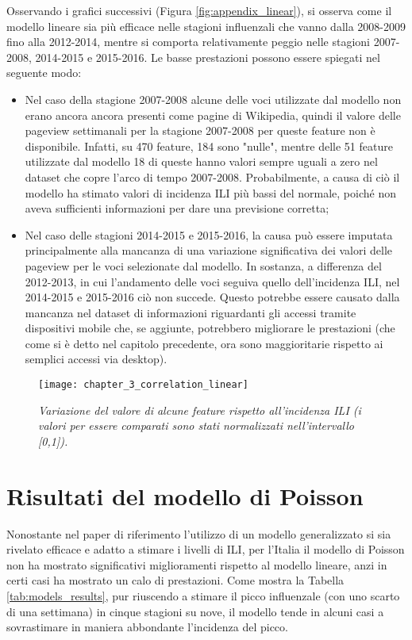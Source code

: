 Osservando i grafici successivi (Figura \ref{fig:appendix_linear}), si osserva come il modello lineare sia più efficace 
nelle stagioni influenzali che vanno dalla 2008-2009 fino alla 2012-2014, mentre si comporta relativamente peggio nelle 
stagioni 2007-2008, 2014-2015 e 2015-2016. Le basse prestazioni possono essere spiegati nel seguente modo: 
\begin{itemize}
\item Nel caso della stagione 2007-2008 alcune delle voci utilizzate dal modello non erano ancora ancora presenti come 
pagine di Wikipedia, quindi il valore delle pageview settimanali per la stagione 2007-2008 per queste feature non è 
disponibile. Infatti, su 470 feature, 184 sono "nulle", mentre delle 51 feature utilizzate dal modello 18 di queste hanno 
valori sempre uguali a zero nel dataset che copre l'arco di tempo 2007-2008. Probabilmente, a causa di ciò il modello ha 
stimato valori di incidenza ILI più bassi del normale, poiché non aveva sufficienti informazioni per dare una previsione 
corretta;
\item Nel caso delle stagioni 2014-2015 e 2015-2016, la causa può essere imputata principalmente alla mancanza di una 
variazione significativa dei valori delle pageview per le voci selezionate dal modello. In sostanza, a differenza del 
2012-2013, in cui l'andamento delle voci seguiva quello dell'incidenza ILI, nel 2014-2015 e 2015-2016 ciò non succede. 
Questo potrebbe essere causato dalla mancanza nel dataset di informazioni riguardanti gli accessi tramite dispositivi mobile 
che, se aggiunte, potrebbero migliorare le prestazioni (che come si è detto nel capitolo precedente, ora sono maggioritarie 
rispetto ai semplici accessi via desktop).
\end{itemize}

\begin{figure}[ht]
\texttt{[image: chapter\_3\_correlation\_linear]}
\caption{\textit{Variazione del valore di alcune feature rispetto all'incidenza ILI (i valori per essere comparati sono stati normalizzati nell'intervallo [0,1]).}}
\label{fig:ch_3_correlation_linear}
\centering
\end{figure}

\section{Risultati del modello di Poisson}
\bigskip

Nonostante nel paper di riferimento \cite{McIver2014} l'utilizzo di un modello generalizzato si sia rivelato efficace e 
adatto a stimare i livelli di ILI, per l'Italia il modello di Poisson non ha mostrato significativi miglioramenti rispetto al 
modello lineare, anzi in certi casi ha mostrato un calo di prestazioni. Come mostra la Tabella 
\ref{tab:models_results}, pur riuscendo a stimare il picco influenzale (con uno scarto di una settimana) in cinque 
stagioni su nove, il modello tende in alcuni casi a sovrastimare in maniera abbondante l'incidenza del picco.
\bigskip

